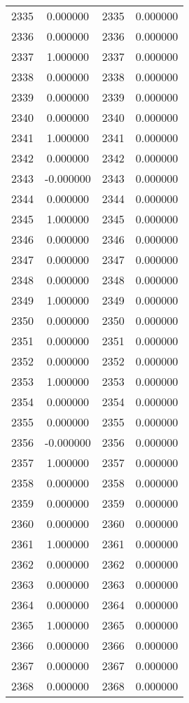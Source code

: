 \documentclass[12pt]{article}
\begin{document}
\begin{longtable}{@{}cccc@{}}
2335 & 0.000000 & 2335 & 0.000000 \\
2336 & 0.000000 & 2336 & 0.000000 \\
2337 & 1.000000 & 2337 & 0.000000 \\
2338 & 0.000000 & 2338 & 0.000000 \\
2339 & 0.000000 & 2339 & 0.000000 \\
2340 & 0.000000 & 2340 & 0.000000 \\
2341 & 1.000000 & 2341 & 0.000000 \\
2342 & 0.000000 & 2342 & 0.000000 \\
2343 & -0.000000 & 2343 & 0.000000 \\
2344 & 0.000000 & 2344 & 0.000000 \\
2345 & 1.000000 & 2345 & 0.000000 \\
2346 & 0.000000 & 2346 & 0.000000 \\
2347 & 0.000000 & 2347 & 0.000000 \\
2348 & 0.000000 & 2348 & 0.000000 \\
2349 & 1.000000 & 2349 & 0.000000 \\
2350 & 0.000000 & 2350 & 0.000000 \\
2351 & 0.000000 & 2351 & 0.000000 \\
2352 & 0.000000 & 2352 & 0.000000 \\
2353 & 1.000000 & 2353 & 0.000000 \\
2354 & 0.000000 & 2354 & 0.000000 \\
2355 & 0.000000 & 2355 & 0.000000 \\
2356 & -0.000000 & 2356 & 0.000000 \\
2357 & 1.000000 & 2357 & 0.000000 \\
2358 & 0.000000 & 2358 & 0.000000 \\
2359 & 0.000000 & 2359 & 0.000000 \\
2360 & 0.000000 & 2360 & 0.000000 \\
2361 & 1.000000 & 2361 & 0.000000 \\
2362 & 0.000000 & 2362 & 0.000000 \\
2363 & 0.000000 & 2363 & 0.000000 \\
2364 & 0.000000 & 2364 & 0.000000 \\
2365 & 1.000000 & 2365 & 0.000000 \\
2366 & 0.000000 & 2366 & 0.000000 \\
2367 & 0.000000 & 2367 & 0.000000 \\
2368 & 0.000000 & 2368 & 0.000000 \\

\end{longtable}
\end{document}
